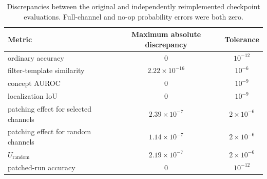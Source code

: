 \begin{table}[h]
\caption{Discrepancies between the original and independently reimplemented checkpoint evaluations. Full-channel and no-op probability errors were both zero.}
\label{tab:audit}
\centering
\small
\begin{tabular}{lcc}
\toprule
Metric & Maximum absolute discrepancy & Tolerance \\
\midrule
ordinary accuracy & 0 & $10^{-12}$ \\
filter-template similarity & $2.22\times10^{-16}$ & $10^{-6}$ \\
concept AUROC & 0 & $10^{-9}$ \\
localization IoU & 0 & $10^{-9}$ \\
patching effect for selected channels & $2.39\times10^{-7}$ & $2\times10^{-6}$ \\
patching effect for random channels & $1.14\times10^{-7}$ & $2\times10^{-6}$ \\
$U_{\mathrm{random}}$ & $2.19\times10^{-7}$ & $2\times10^{-6}$ \\
patched-run accuracy & 0 & $10^{-12}$ \\
\bottomrule
\end{tabular}
\end{table}